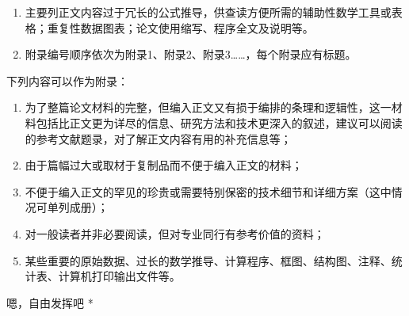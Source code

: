 \appendix
\begin{spacing}{1.3}\xiaosi %
\thispagestyle{fancy}%

\begin{enumerate}[label=\arabic*)]
\item 主要列正文内容过于冗长的公式推导，供查读方便所需的辅助性数学工具或表格；重复性数据图表；论文使用缩写、程序全文及说明等。

\item 附录编号顺序依次为附录1、附录2、附录3……，每个附录应有标题。
\end{enumerate}
下列内容可以作为附录：

\begin{enumerate}[label=\arabic*)]
\item 为了整篇论文材料的完整，但编入正文又有损于编排的条理和逻辑性，这一材料包括比正文更为详尽的信息、研究方法和技术更深入的叙述，建议可以阅读的参考文献题录，对了解正文内容有用的补充信息等；
\item 由于篇幅过大或取材于复制品而不便于编入正文的材料；
\item 不便于编入正文的罕见的珍贵或需要特别保密的技术细节和详细方案（这中情况可单列成册）；
\item 对一般读者并非必要阅读，但对专业同行有参考价值的资料；
\item 某些重要的原始数据、过长的数学推导、计算程序、框图、结构图、注释、统计表、计算机打印输出文件等。
\end{enumerate}

\par * 嗯，自由发挥吧 * \par

\end{spacing}